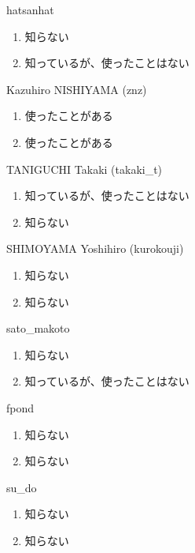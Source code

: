 \begin{prework}{ hatsanhat }
  \begin{enumerate}
  \item 知らない
  \item 知っているが、使ったことはない
  \end{enumerate}
\end{prework}

\begin{prework}{ Kazuhiro NISHIYAMA (znz) }
  \begin{enumerate}
  \item 使ったことがある
  \item 使ったことがある
  \end{enumerate}
\end{prework}

\begin{prework}{ TANIGUCHI Takaki (takaki\_t) }
  \begin{enumerate}
  \item 知っているが、使ったことはない
  \item 知らない
  \end{enumerate}
\end{prework}

\begin{prework}{ SHIMOYAMA Yoshihiro (kurokouji) }
  \begin{enumerate}
  \item 知らない
  \item 知らない
  \end{enumerate}
\end{prework}

\begin{prework}{ sato\_makoto }
  \begin{enumerate}
  \item 知らない
  \item 知っているが、使ったことはない
  \end{enumerate}
\end{prework}

\begin{prework}{ fpond }
  \begin{enumerate}
  \item 知らない
  \item 知らない
  \end{enumerate}
\end{prework}

\begin{prework}{ su\_do }
  \begin{enumerate}
  \item 知らない
  \item 知らない
  \end{enumerate}
\end{prework}

